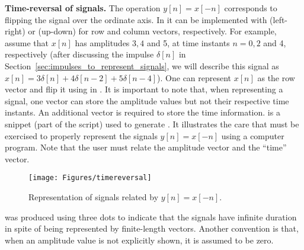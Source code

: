 \bExample \textbf{Time-reversal of signals.}
The operation $y[n]=x[-n]$ corresponds to flipping the signal over the ordinate axis. In {\matlab} it can be implemented with  (left-right) or  (up-down) for row and column vectors, respectively. For example, assume that $x[n]$ has amplitudes $3, 4$ and 5, at time instants $n=0, 2$ and 4, respectively (after discussing the impulse $\delta[n]$ in Section~\ref{sec:impulses_to_represent_signals}, we will describe this signal as $x[n]=3 \delta[n] + 4 \delta[n-2] + 5 \delta[n-4]$). One can represent $x[n]$ as the row vector  and flip it using  in {\matlab}.
It is important to note that, when representing a signal, one vector can store the amplitude values but not their respective time instants. An additional vector is required to store the time information.  is a snippet (part of the script) used to generate . It illustrates the care that must be exercised to properly represent the signals $y[n]=x[-n]$ using a computer program. Note that the user must relate the amplitude vector and the ``time'' vector.
\enlargethispage{2\baselineskip}

\begin{figure}
	\centering
		\texttt{[image: Figures/timereversal]}		
	\caption{Representation of signals related by $y[n]=x[-n]$.\label{fig:timereversal}}
\end{figure}

 was produced using three dots to indicate that the signals have infinite duration in spite of being represented by finite-length vectors. Another convention is that, when an amplitude value is not explicitly shown, it is assumed to be zero.
\eExample


